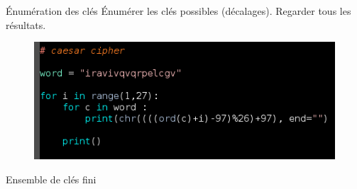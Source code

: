 \documentclass{beamer}
\begin{document}
\begin{frame}{Énumération des clés}
  Énumérer les clés possibles (décalages). Regarder tous les résultats.

  \begin{figure}
    \centering
    \includegraphics[scale = 0.6]{cesarcode.png}
\end{figure}

\begin{block}{}
Ensemble de clés fini
\end{block}

  \end{frame}



  
  
  
  
\end{document}
